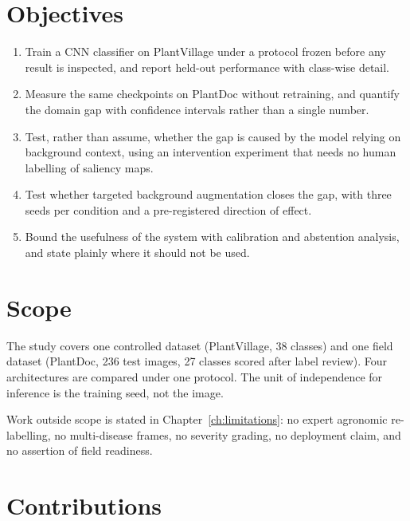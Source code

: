 \section{Objectives}

\begin{enumerate}[leftmargin=1.4em,itemsep=2pt]
\item Train a CNN classifier on PlantVillage under a protocol frozen before any
      result is inspected, and report held-out performance with class-wise detail.
\item Measure the same checkpoints on PlantDoc without retraining, and quantify the
      domain gap with confidence intervals rather than a single number.
\item Test, rather than assume, whether the gap is caused by the model relying on
      background context, using an intervention experiment that needs no human
      labelling of saliency maps.
\item Test whether targeted background augmentation closes the gap, with three
      seeds per condition and a pre-registered direction of effect.
\item Bound the usefulness of the system with calibration and abstention analysis,
      and state plainly where it should not be used.
\end{enumerate}

\section{Scope}

The study covers one controlled dataset (PlantVillage, 38 classes) and one field
dataset (PlantDoc, 236 test images, 27 classes scored after label review). Four
architectures are compared under one protocol. The unit of independence for
inference is the training seed, not the image.

Work outside scope is stated in Chapter~\ref{ch:limitations}: no expert agronomic
re-labelling, no multi-disease frames, no severity grading, no deployment claim, and
no assertion of field readiness.

\section{Contributions}

